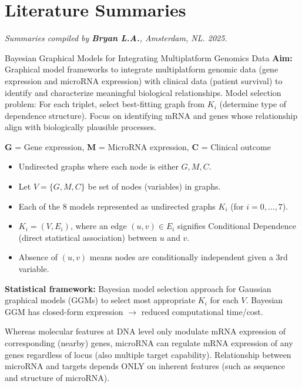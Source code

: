 \documentclass[twocolumn]{article}
\begin{document}
\section*{Literature Summaries}
\vspace{0em}
    \large\textit{Summaries compiled by \textbf{Bryan L.A.}, Amsterdam, NL. 2025.}
\vspace{1em}

\begin{literaturepaper}{Bayesian Graphical Models for Integrating Multiplatform Genomics Data \cite{Wang_Baladandayuthapani_Holmes_Do_2013}}
\label{paper-summary-1}
\small
    \textbf{Aim:} Graphical model frameworks to integrate multiplatform genomic data (gene expression and microRNA expression) with clinical data (patient survival) to identify and characterize meaningful biological relationships. Model selection problem: For each triplet, select best-fitting graph from $K_i$ (determine type of dependence structure). Focus on identifying mRNA and genes whose relationship align with biologically plausible processes.

    \textbf{G} = Gene expression, \textbf{M} = MicroRNA expression, \textbf{C} = Clinical outcome
    
    \begin{itemize}[label=$\circ$]
        \item Undirected graphs where each node is either $G, M, C$.
        \item Let $V = \{G,M,C\}$ be set of nodes (variables) in graphs.
        \item Each of the 8 models represented as undirected graphs $K_i$ (for $i = 0,...,7$).
        \item $K_i = (V, E_i)$, where an edge $(u, v) \in E_i$ signifies Conditional Dependence (direct statistical association) between $u$ and $v$.
        \item Absence of $(u, v)$ means nodes are conditionally independent given a 3rd variable.
    \end{itemize}

    \textbf{Statistical framework:} Bayesian model selection approach for Gaussian graphical models (GGMs) to select most appropriate $K_i$ for each $V$. Bayesian GGM has closed-form expression $\to$ reduced computational time/cost.

    Whereas molecular features at DNA level only modulate mRNA expression of corresponding (nearby) genes, microRNA can regulate mRNA expression of any genes regardless of locus (also multiple target capability). Relationship between microRNA and targets depends ONLY on inherent features (such as sequence and structure of microRNA).


\end{literaturepaper}
\end{document}
